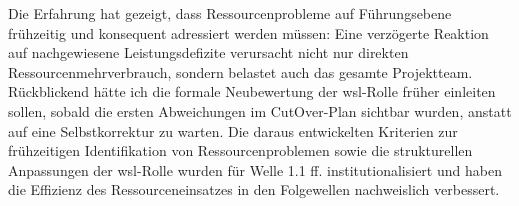\par Die Erfahrung hat gezeigt, dass Ressourcenprobleme auf Führungsebene frühzeitig und konsequent adressiert werden müssen: Eine verzögerte Reaktion auf nachgewiesene Leistungsdefizite verursacht nicht nur direkten Ressourcenmehrverbrauch, sondern belastet auch das gesamte Projektteam. Rückblickend hätte ich die formale Neubewertung der \gls{wsl}-Rolle früher einleiten sollen, sobald die ersten Abweichungen im CutOver-Plan sichtbar wurden, anstatt auf eine Selbstkorrektur zu warten. Die daraus entwickelten Kriterien zur frühzeitigen Identifikation von Ressourcenproblemen sowie die strukturellen Anpassungen der \gls{wsl}-Rolle wurden für Welle 1.1 ff. institutionalisiert und haben die Effizienz des Ressourceneinsatzes in den Folgewellen nachweislich verbessert.